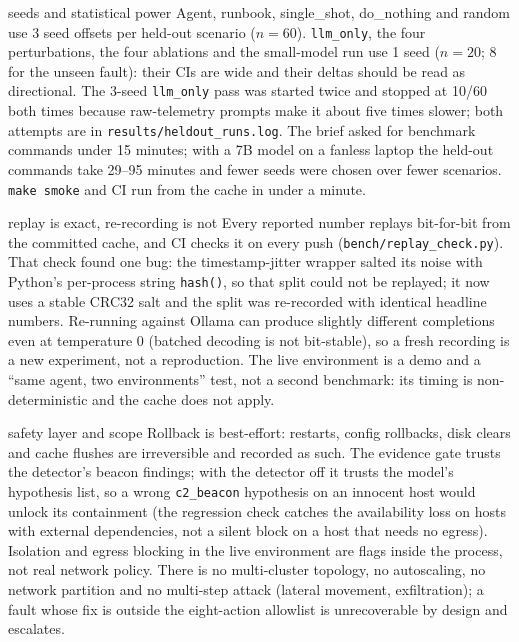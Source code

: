 \documentclass[11pt,a4paper]{article}
\newcommand{\code}[1]{\texttt{#1}}
\begin{document}
\begin{limitation}{seeds and statistical power}
Agent, runbook, single\_shot, do\_nothing and random use 3 seed offsets per held-out scenario
($n=60$). \code{llm\_only}, the four perturbations, the four ablations and the small-model run use 1
seed ($n=20$; 8 for the unseen fault): their CIs are wide and their deltas should be read as
directional. The 3-seed \code{llm\_only} pass was started twice and stopped at 10/60 both times
because raw-telemetry prompts make it about five times slower; both attempts are in
\code{results/heldout\_runs.log}. The brief asked for benchmark commands under 15 minutes; with a 7B
model on a fanless laptop the held-out commands take 29--95 minutes and fewer seeds were chosen over
fewer scenarios. \code{make smoke} and CI run from the cache in under a minute.
\end{limitation}

\begin{limitation}{replay is exact, re-recording is not}
Every reported number replays bit-for-bit from the committed cache, and CI checks it on every
push (\code{bench/replay\_check.py}). That check found one bug: the timestamp-jitter wrapper salted
its noise with Python's per-process string \code{hash()}, so that split could not be replayed; it
now uses a stable CRC32 salt and the split was re-recorded with identical headline numbers. Re-running against Ollama can
produce slightly different completions even at temperature 0 (batched decoding is not bit-stable),
so a fresh recording is a new experiment, not a reproduction. The live environment is a demo and a
``same agent, two environments'' test, not a second benchmark: its timing is non-deterministic and
the cache does not apply.
\end{limitation}

\begin{limitation}{safety layer and scope}
Rollback is best-effort: restarts, config rollbacks, disk clears and cache flushes are irreversible
and recorded as such. The evidence gate trusts the detector's beacon findings; with the detector off
it trusts the model's hypothesis list, so a wrong \code{c2\_beacon} hypothesis on an innocent host
would unlock its containment (the regression check catches the availability loss on hosts with
external dependencies, not a silent block on a host that needs no egress). Isolation and egress
blocking in the live environment are flags inside the process, not real network policy. There is no
multi-cluster topology, no autoscaling, no network partition and no multi-step attack (lateral
movement, exfiltration); a fault whose fix is outside the eight-action allowlist is unrecoverable by
design and escalates.
\end{limitation}
\end{document}
